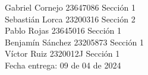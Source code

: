 \documentclass[letterpaper]{article}
\begin{document}
	\vspace*{30mm}
	\flushright 
	
	Gabriel Cornejo 23647086 Sección 1\\
	Sebastián Lorca 23200316 Sección 2\\
	Pablo Rojas 23645016 Sección 1\\
	Benjamín Sánchez  23205873 Sección 1\\
	Víctor Ruiz 2320012J Sección 1\\
	
	
	\vspace*{5mm}
	{\large Fecha entrega: 09 de 04 de 2024\\}
	
	\newpage
	\begin{flushleft}
		\tableofcontents
	\end{flushleft}
	
\end{document}
